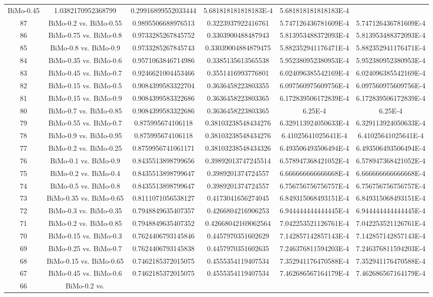 \documentclass[a4paper,10pt]{article}
\begin{document}
\begin{landscape}
\begin{table}[!htp]
\begin{tabular}{cccccc}
BiMo-0.45&1.0382170952368799&0.29916899552033444&5.681818181818183E-4&5.681818181818183E-4\\87&BiMo-0.2 vs. BiMo-0.55&0.9895506688976513&0.3223937922416761&5.747126436781609E-4&5.747126436781609E-4\\86&BiMo-0.75 vs. BiMo-0.8&0.9733285267845752&0.3303900488487943&5.813953488372093E-4&5.813953488372093E-4\\85&BiMo-0.8 vs. BiMo-0.9&0.9733285267845743&0.33039004884879475&5.882352941176471E-4&5.882352941176471E-4\\84&BiMo-0.35 vs. BiMo-0.6&0.9571063846714986&0.3385135613565538&5.952380952380953E-4&5.952380952380953E-4\\83&BiMo-0.45 vs. BiMo-0.7&0.9246621004453466&0.3551416993776801&6.024096385542169E-4&6.024096385542169E-4\\82&BiMo-0.15 vs. BiMo-0.5&0.9084399583322704&0.3636458223803355&6.097560975609756E-4&6.097560975609756E-4\\81&BiMo-0.15 vs. BiMo-0.9&0.9084399583322686&0.3636458223803365&6.172839506172839E-4&6.172839506172839E-4\\80&BiMo-0.7 vs. BiMo-0.85&0.9084399583322686&0.3636458223803365&6.25E-4&6.25E-4\\79&BiMo-0.55 vs. BiMo-0.7&0.875995674106118&0.38103238548434276&6.329113924050633E-4&6.329113924050633E-4\\78&BiMo-0.9 vs. BiMo-0.95&0.875995674106118&0.38103238548434276&6.41025641025641E-4&6.41025641025641E-4\\77&BiMo-0.2 vs. BiMo-0.25&0.8759956741061171&0.38103238548434326&6.493506493506494E-4&6.493506493506494E-4\\76&BiMo-0.1 vs. BiMo-0.9&0.8435513898799656&0.39892013747245514&6.578947368421052E-4&6.578947368421052E-4\\75&BiMo-0.2 vs. BiMo-0.4&0.8435513898799647&0.3989201374724557&6.666666666666668E-4&6.666666666666668E-4\\74&BiMo-0.5 vs. BiMo-0.8&0.8435513898799647&0.3989201374724557&6.756756756756757E-4&6.756756756756757E-4\\73&BiMo-0.35 vs. BiMo-0.65&0.8111071056538127&0.4173041656274045&6.849315068493151E-4&6.849315068493151E-4\\72&BiMo-0.3 vs. BiMo-0.35&0.7948849635407357&0.4266804216906253&6.944444444444445E-4&6.944444444444445E-4\\71&BiMo-0.2 vs. BiMo-0.85&0.7948849635407352&0.42668042169062564&7.042253521126761E-4&7.042253521126761E-4\\70&BiMo-0.15 vs. BiMo-0.3&0.7624406793145846&0.4457970351602629&7.142857142857143E-4&7.142857142857143E-4\\69&BiMo-0.25 vs. BiMo-0.7&0.7624406793145838&0.4457970351602635&7.246376811594203E-4&7.246376811594203E-4\\68&BiMo-0.15 vs. BiMo-0.65&0.7462185372015075&0.4555354119407534&7.352941176470588E-4&7.352941176470588E-4\\67&BiMo-0.45 vs. BiMo-0.6&0.7462185372015075&0.4555354119407534&7.462686567164179E-4&7.462686567164179E-4\\66&BiMo-0.2 vs. 
\end{tabular}
\end{table}
\end{landscape}
\end{document}
